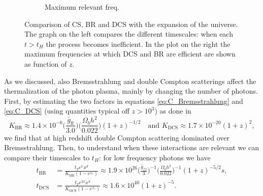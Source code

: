 \begin{figure}
\begin{subfigure}[b]{0.48\textwidth}
        \caption{Maximum relevant freq.}
        \label{fig:critical_frequencies}
    \end{subfigure}
    \caption{Comparison of CS, BR and DCS with the expansion of the universe. The graph on the left compares the different timescales: when each $t>t_H$ the process becomes inefficient. In the plot on the right the maximum frequencies at which DCS and BR are efficient are shown as function of $z$.}
\end{figure}
As we discussed, also Bremsstrahlung and double Compton scatterings affect the thermalization of the photon plasma, mainly by changing the number of photons. First, by estimating the two factors in equations \eqref{eq:C_Bremsstrahlung} and \eqref{eq:C_DCS} (using quantities typical off $z>10^3$) as done in \cite{chlubafuturestepscosmologyusing}
$$K_\text{BR}\approx1.4\times10^{-6}\bigg(\frac{\bar{g}_\text{ff}}{3.0}\bigg)\bigg(\frac{\Omega_b h^2}{0.022}\bigg)(1+z)^{-1/2}\quad\text{and }K_\text{DCS}\approx1.7\times10^{-20}(1+z)^2,$$ we find that at high redshift double Compton scattering dominated over Bremsstrahlung. Then, to understand when these interactions are relevant we can compare their timescales to $t_H$: for low frequency photons we have
\begin{align*}
    t_{\text{BR}}&=\frac{t_Te^{x}x^3}{K_\text{BR}(1-e^{x_e})}\approx1.9\times10^{26}\bigg(\frac{\bar{g}_{ff}}{3}\bigg)^{-1}\bigg(\frac{\Omega_bh^2}{0.022}\bigg)^{-1}(1+z)^{-5/2}s,\\
    t_{\text{DCS}}&=\frac{t_Te^{2x}x^3}{K_\text{DCS}(1-e^{x_e})}\approx1.6\times10^{40}(1+z)^{-5}.
\end{align*}
